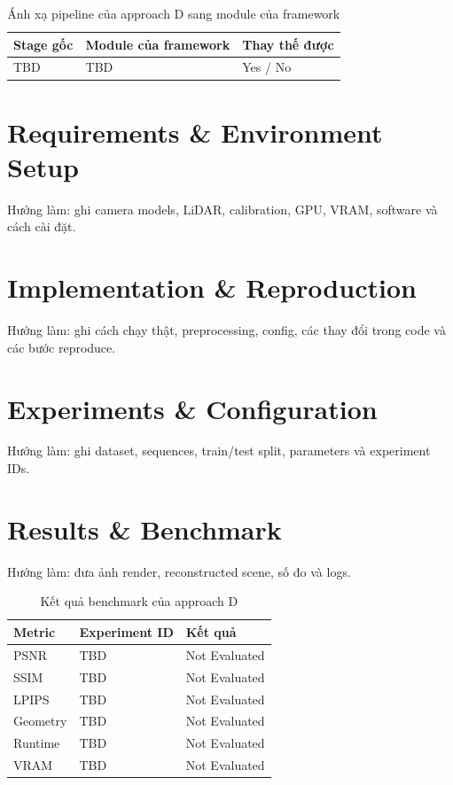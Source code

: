 \begin{table}[H]
  \centering
  \caption{Ánh xạ pipeline của approach D sang module của framework}
  \begin{tabularx}{\linewidth}{X X l}
    \toprule
    \textbf{Stage gốc} & \textbf{Module của framework} & \textbf{Thay thế được} \\
    \midrule
    TBD & TBD & Yes / No \\
    \bottomrule
  \end{tabularx}
\end{table}

\section{Requirements \& Environment Setup}

Hướng làm: ghi camera models, LiDAR, calibration, GPU, VRAM, software và cách cài đặt.

\section{Implementation \& Reproduction}

Hướng làm: ghi cách chạy thật, preprocessing, config, các thay đổi trong code và các bước reproduce.

\section{Experiments \& Configuration}

Hướng làm: ghi dataset, sequences, train/test split, parameters và experiment IDs.

\section{Results \& Benchmark}

Hướng làm: đưa ảnh render, reconstructed scene, số đo và logs.

\begin{table}[H]
  \centering
  \caption{Kết quả benchmark của approach D}
  \begin{tabularx}{\linewidth}{X l l}
    \toprule
    \textbf{Metric} & \textbf{Experiment ID} & \textbf{Kết quả} \\
    \midrule
    PSNR & TBD & Not Evaluated \\
    SSIM & TBD & Not Evaluated \\
    LPIPS & TBD & Not Evaluated \\
    Geometry & TBD & Not Evaluated \\
    Runtime & TBD & Not Evaluated \\
    VRAM & TBD & Not Evaluated \\
    \bottomrule
  \end{tabularx}
\end{table}

